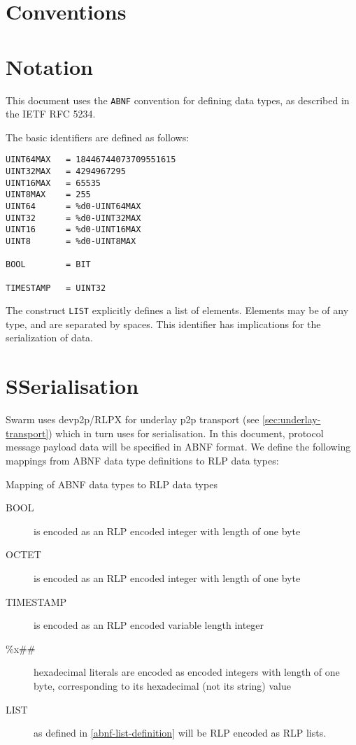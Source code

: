 \section{Conventions}\label{spec:conventions}
\section{Notation}\label{spec:notation}

This document uses the \texttt{ABNF} convention for defining data types, as described in the IETF RFC 5234. \cite{IETF:ABNF}


The basic identifiers are defined as follows:

\begin{lstlisting}[numbers=none]
UINT64MAX	= 18446744073709551615
UINT32MAX	= 4294967295
UINT16MAX	= 65535
UINT8MAX	= 255
UINT64		= %d0-UINT64MAX
UINT32		= %d0-UINT32MAX
UINT16		= %d0-UINT16MAX
UINT8		= %d0-UINT8MAX

BOOL		= BIT

TIMESTAMP	= UINT32
\end{lstlisting}

The construct \texttt{LIST} explicitly defines a list of elements. Elements may be of any type, and are separated by spaces. This identifier has implications for the serialization of data. 

\section{SSerialisation} \label{sec:rlp}

Swarm uses devp2p/RLPX for underlay p2p transport (see \ref{sec:underlay-transport}) which in turn uses  \cite{ETHWIKI:RLP} for serialisation. 
In this document, protocol message payload data will be specified in ABNF format. We define the following mappings from ABNF data type definitions to RLP data types:

\begin{definition}{Mapping of ABNF data types to RLP data types}\label{sec:abnf-rlp}
\begin{description}
\item [BOOL] is encoded as an RLP encoded integer with length of one byte
\item [OCTET] is encoded as an RLP encoded integer with length of one byte
\item [TIMESTAMP] is encoded as an RLP encoded variable length integer
\item [\%x\#\#] hexadecimal literals are encoded as encoded integers with length of one byte, corresponding to its hexadecimal (not its string) value
\item [LIST] as defined in \ref{abnf-list-definition} will be RLP encoded as RLP lists.
\end{description}
\end{definition}


